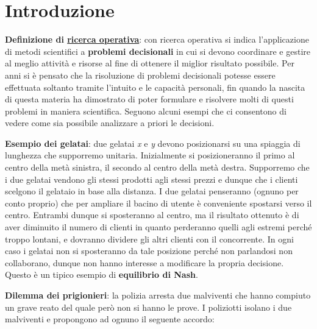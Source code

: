 \documentclass[11pt, oneside]{book}
\begin{document}
\tableofcontents


\chapter{Introduzione}

{\bf Definizione di \underline{ricerca operativa}}: con ricerca
operativa si indica l'applicazione di metodi scientifici a {\bf
  problemi decisionali} in cui si devono coordinare e gestire al
meglio attivit\`a e risorse al fine di ottenere il miglior risultato
possibile. Per anni si \`e pensato che la risoluzione di problemi
decisionali potesse essere effettuata soltanto tramite l'intuito e le
capacit\`a personali, fin quando la nascita di questa materia ha
dimostrato di poter formulare e risolvere molti di questi problemi in
maniera scientifica. Seguono alcuni esempi che ci consentono di vedere
come sia possibile analizzare a priori le decisioni.

\par\bigskip 

{\bf Esempio dei gelatai}: due gelatai {\em x} e {\em y} devono
posizionarsi su una spiaggia di lunghezza che supporremo
unitaria. Inizialmente si posizioneranno il primo al centro della
met\`a sinistra, il secondo al centro della met\`a destra. Supporremo
che i due gelatai vendono gli stessi prodotti agli stessi prezzi e
dunque che i clienti scelgono il gelataio in base alla distanza. I due
gelatai penseranno (ognuno per conto proprio) che per ampliare il
bacino di utente \`e conveniente spostarsi verso il centro. Entrambi
dunque si sposteranno al centro, ma il risultato ottenuto \`e di aver
diminuito il numero di clienti in quanto perderanno quelli agli
estremi perch\'e troppo lontani, e dovranno dividere gli altri clienti
con il concorrente. In ogni caso i gelatai non si sposteranno da tale
posizione perch\'e non parlandosi non collaborano, dunque non hanno
interesse a modificare la propria decisione. Questo \`e un tipico
esempio di {\bf equilibrio di Nash}.

\par\bigskip 

{\bf Dilemma dei prigionieri}: la polizia arresta due malviventi che
hanno compiuto un grave reato del quale per\`o non si hanno le
prove. I poliziotti isolano i due malviventi e propongono ad ognuno il
seguente accordo:
\end{document}

